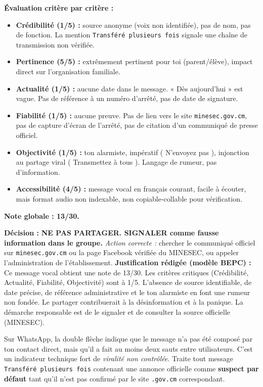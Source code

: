 \documentclass[11pt]{article}
\begin{document}
\begin{exemplebox}
\textbf{Évaluation critère par critère :}
\begin{itemize}
    \item \textbf{Crédibilité (1/5) :} source anonyme (voix non identifiée), pas de nom, pas de fonction. La mention \texttt{Transféré plusieurs fois} signale une chaîne de transmission non vérifiée.
    \item \textbf{Pertinence (5/5) :} extrêmement pertinent pour toi (parent/élève), impact direct sur l'organisation familiale.
    \item \textbf{Actualité (1/5) :} aucune date dans le message. « Dès aujourd'hui » est vague. Pas de référence à un numéro d'arrêté, pas de date de signature.
    \item \textbf{Fiabilité (1/5) :} aucune preuve. Pas de lien vers le site \texttt{minesec.gov.cm}, pas de capture d'écran de l'arrêté, pas de citation d'un communiqué de presse officiel.
    \item \textbf{Objectivité (1/5) :} ton alarmiste, impératif (\og{} N'envoyez pas \fg{}), injonction au partage viral (\og{} Transmettez à tous \fg{}). Langage de rumeur, pas d'information.
    \item \textbf{Accessibilité (4/5) :} message vocal en français courant, facile à écouter, mais format audio non indexable, non copiable-collable pour vérification.
\end{itemize}
\textbf{Note globale : 13/30.}

\textbf{Décision :} \textbf{NE PAS PARTAGER. SIGNALER comme fausse information dans le groupe.} \emph{Action correcte :} chercher le communiqué officiel sur \texttt{minesec.gov.cm} ou la page Facebook vérifiée du MINESEC, ou appeler l'administration de l'établissement.
\tcblower
\textbf{Justification rédigée (modèle BEPC) :}
\og{} Ce message vocal obtient une note de 13/30. Les critères critiques (Crédibilité, Actualité, Fiabilité, Objectivité) sont à 1/5. L'absence de source identifiable, de date précise, de référence administrative et le ton alarmiste en font une rumeur non fondée. Le partager contribuerait à la désinformation et à la panique. La démarche responsable est de le signaler et de consulter la source officielle (MINESEC). \fg{}
\end{exemplebox}

\begin{attention}
Sur WhatsApp, la double flèche indique que le message n'a pas été composé par ton contact direct, mais qu'il a fait au moins deux sauts entre utilisateurs. C'est un indicateur technique fort de \emph{viralité non contrôlée}. Traite tout message \texttt{Transféré plusieurs fois} contenant une annonce officielle comme \textbf{suspect par défaut} tant qu'il n'est pas confirmé par le site \texttt{.gov.cm} correspondant.
\end{attention}
\end{document}
